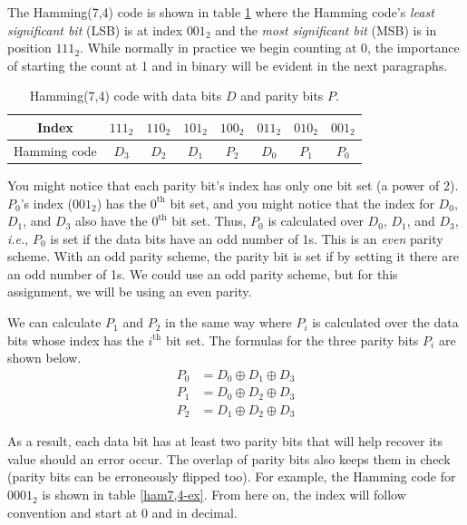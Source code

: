 \documentclass[11pt]{article}
\begin{document}
The Hamming(7,4) code is shown in table \ref{ham7,4} where the Hamming
code's \emph{least significant bit} (LSB) is at index $001_2$ and the
\emph{most significant bit} (MSB) is in position $111_2$. While normally
in practice we begin counting at 0, the importance of starting the count
at 1 and in binary will be evident in the next paragraphs.

\begin{table}[h]
  \centering
  \begin{tabular}{ |c|c|c|c|c|c|c|c| }
     \hline
     Index & $111_2$ & $110_2$ & $101_2$ & $100_2$ & $011_2$ & $010_2$ & $001_2$ \\
     \hline \hline
     Hamming code & $D_3$ & $D_2$ & $D_1$ & $P_2$ & $D_0$ & $P_1$ & $P_0$ \\
     \hline
  \end{tabular}
  \caption{Hamming(7,4) code with data bits $D$ and parity bits $P$.}
  \label{ham7,4}
\end{table}


You might notice that each parity bit's index has only one bit set (a
power of 2). $P_0$'s index ($001_2$) has the $0^\text{th}$ bit set, and you
might notice that the index for $D_0$, $D_1$, and $D_3$ also have the
$0^\text{th}$ bit set. Thus, $P_0$ is calculated over $D_0$, $D_1$, and
$D_3$, \textit{i.e.}, $P_0$ is set if the data bits have an odd number
of 1s. This is an \emph{even} parity scheme. With an odd parity scheme,
the parity bit is set if by setting it there are an odd number of 1s. We
could use an odd parity scheme, but for this assignment, we will be
using an even parity.

We can calculate $P_1$ and $P_2$ in the same way where $P_i$ is
calculated over the data bits whose index has the $i^\text{th}$ bit set. The
formulas for the three parity bits $P_i$ are shown below.
\begin{equation*}
  \begin{split}
    P_0 &= D_0 \oplus D_1 \oplus D_3 \\
    P_1 &= D_0 \oplus D_2 \oplus D_3 \\
    P_2 &= D_1 \oplus D_2 \oplus D_3
  \end{split}
\end{equation*}

\noindent As a result, each data bit has at least two parity bits that
will help recover its value should an error occur. The overlap of parity
bits also keeps them in check (parity bits can be erroneously flipped
too). For example, the Hamming code for $0001_2$ is shown in table
\ref{ham7,4-ex}.  From here on, the index will follow convention and
start at 0 and in decimal.
\end{document}
